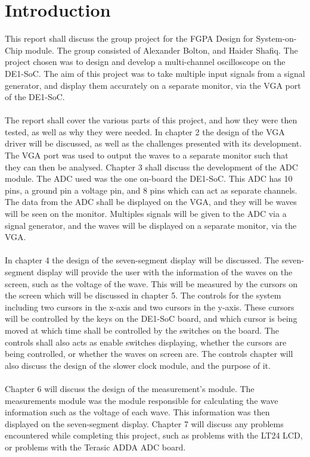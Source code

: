 \documentclass[a4paper,12pt]{article}
\begin{document}
\section{Introduction}
\begin{flushleft}
This report shall discuss the group project for the FGPA Design for System-on-Chip module. The group consisted of Alexander Bolton, and Haider Shafiq. The project chosen was to design and develop a multi-channel oscilloscope on the DE1-SoC. The aim of this project was to take multiple input signals from a signal generator, and display them accurately on a separate monitor, via the VGA port of the DE1-SoC. \\ \- \\
The report shall cover the various parts of this project, and how they were then tested, as well as why they were needed. In chapter 2 the design of the VGA driver will be discussed, as well as the challenges presented with its development. The VGA port was used to output the waves to a separate monitor such that they can then be analysed.
Chapter 3 shall discuss the development of the ADC module. The ADC used was the one on-board the DE1-SoC. This ADC has 10 pins, a ground pin a voltage pin, and 8 pins which can act as separate channels. The data from the ADC shall be displayed on the VGA, and they will be waves will be seen on the monitor. Multiples signals will be given to the ADC via a signal generator, and the waves will be displayed on a separate monitor, via the VGA. \\ \- \\
In chapter 4 the design of the seven-segment display will be discussed. The seven-segment display will provide the user with the information of the waves on the screen, such as the voltage of the wave. This will be measured by the cursors on the screen which will be discussed in chapter 5. The controls for the system including two cursors in the x-axis and two cursors in the y-axis. These cursors will be controlled by the keys on the DE1-SoC board, and which cursor is being moved at which time shall be controlled by the switches on the board. The controls shall also acts as enable switches displaying, whether the cursors are being controlled, or whether the waves on screen are. The controls chapter will also discuss the design of the slower clock module, and the purpose of it.   \\ \- \\
Chapter 6 will discuss the design of the measurement's module.  The measurements module was the module responsible for calculating the wave information such as the voltage of each wave. This information was then displayed on the seven-segment display. Chapter 7 will discuss any problems encountered while completing this project, such as problems with the LT24 LCD, or problems with the Terasic ADDA ADC board. \\ \- \\

\end{flushleft}
\end{document}
